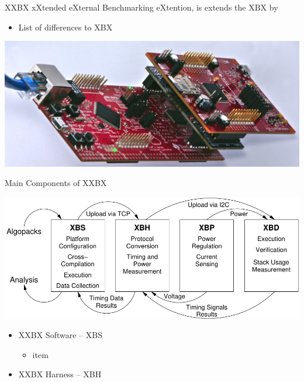\documentclass[xcolor=pdftex,dvipsnames,table,final]{beamer}
\begin{document}
\begin{frame}[fragile]{}
\begin{columns}[t]
\begin{column}{.31\linewidth}
      \begin{block}{XXBX}
        {x\color{red}X}tended e{\color{red}X}ternal {\color{red}B}enchmarking 
        e{\color{red}X}tention, is extends the XBX by 
        \begin{itemize}
          \item List of differences to XBX
        \end{itemize}
        \begin{center}
          \includegraphics[scale=1.5]{../figures/xxbx-tilted}
        \end{center} 
      \end{block}
      \begin{block}{Main Components of XXBX}
        \begin{center}
          \includegraphics[scale=1.5]{../figures/xxbx_block}
        \end{center} 
        \begin{itemize}
          \item XXBX Software -- XBS 
          \begin{itemize}
            \item item 
          \end{itemize}
          \item XXBX Harness -- XBH 

\end{itemize}
\end{block}
\end{column}
\end{columns}
\end{frame}
\end{document}
